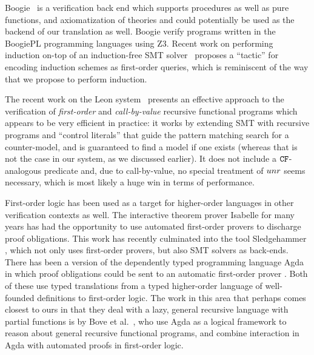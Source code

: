 Boogie~\cite{boogie} is a verification back end which supports procedures as well as 
pure functions, and axiomatization of theories and could potentially be used as the 
backend of our translation as well. Boogie verify programs written in the BoogiePL 
programming languages using Z3. Recent work on performing induction on-top of an 
induction-free SMT solver~\cite{Leino:2012:AIS:2189257.2189278} proposes a ``tactic''
for encoding induction schemes as first-order queries, which is reminiscent of the way
that we propose to perform induction.

The recent work on the Leon system~\cite{Suter:2011:SMR:2041552.2041575} presents
an effective approach to the verification of {\em first-order} and {\em call-by-value} 
recursive functional programs which appears to be very efficient in practice: it works
by extending SMT with recursive programs and ``control literals'' that guide the pattern
matching search for a counter-model, and is guaranteed to find a model if one exists 
(whereas that is not the case in our system, as we discussed earlier). It does not include
a ${\tt CF}$-analogous predicate and, due to call-by-value, no special treatment of $\mathop{unr}$ seems
necessary, which is most likely a huge win in terms of performance.

First-order logic has been used as a target for higher-order languages in other verification contexts as well.
The interactive theorem prover Isabelle for many years has had the opportunity to use
automated first-order provers to discharge proof obligations. This work has recently culminated into the tool
Sledgehammer \cite{Sledgehammer}, which not only uses first-order provers, but also SMT solvers as back-ends.
There has been a version of the dependently typed programming language Agda in which
proof obligations could be sent to an automatic first-order prover \cite{AgdaFOL}. Both of these use typed translations from a typed higher-order language of well-founded definitions to first-order logic. The work in this area that perhaps comes closest to ours in that they deal with a lazy, general recursive language with partial functions is by Bove et al.\ \cite{TypeTheoryFOL}, who use Agda as a logical framework to reason about general recursive functional programs, and combine interaction in Agda with automated proofs in first-order logic.


